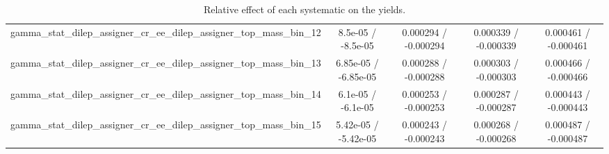 \documentclass[10pt]{article}
\begin{document}
\begin{table}[htbp]
\begin{center}
\begin{tabular}{|c|c|c|c|c|}
  gamma_stat_dilep_assigner_cr_ee_dilep_assigner_top_mass_bin_12 & 8.5e-05 / -8.5e-05 & 0.000294 / -0.000294 & 0.000339 / -0.000339 & 0.000461 / -0.000461 \\ 
  gamma_stat_dilep_assigner_cr_ee_dilep_assigner_top_mass_bin_13 & 6.85e-05 / -6.85e-05 & 0.000288 / -0.000288 & 0.000303 / -0.000303 & 0.000466 / -0.000466 \\ 
  gamma_stat_dilep_assigner_cr_ee_dilep_assigner_top_mass_bin_14 & 6.1e-05 / -6.1e-05 & 0.000253 / -0.000253 & 0.000287 / -0.000287 & 0.000443 / -0.000443 \\ 
  gamma_stat_dilep_assigner_cr_ee_dilep_assigner_top_mass_bin_15 & 5.42e-05 / -5.42e-05 & 0.000243 / -0.000243 & 0.000268 / -0.000268 & 0.000487 / -0.000487 \\ 
\hline 
\end{tabular} 
\caption{Relative effect of each systematic on the yields.} 
\end{center} 
\end{table} 
\end{document}
